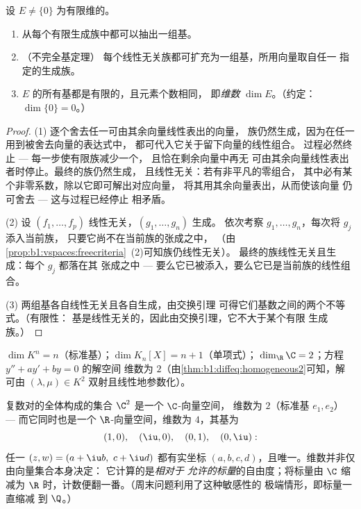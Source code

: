 \begin{theorem}[有限维中的基]\label{thm:b1:findim:bases}
设 $E \neq \{0\}$ 为有限维的。
\begin{enumerate}
  \item 从每个有限生成族中都可以抽出一组基。
  \item （不完全基定理）
        每个线性无关族都可扩充为一组基，所用向量取自任一
        指定的生成族。
  \item $E$ 的所有基都是有限的，且元素个数相同，
        即\emph{维数} $\dim E$。（约定：
        $\dim\{0\} = 0$。）
\end{enumerate}
\end{theorem}

\begin{proof}
(1) 逐个舍去任一可由其余向量线性表出的向量，
族仍然生成，因为在任一用到被舍去向量的表达式中，
都可代入它关于留下向量的线性组合。
过程必然终止 --- 每一步使有限族减少一个，
且恰在剩余向量中再无
可由其余向量线性表出者时停止。最终的族仍然生成，
且线性无关：若有非平凡的零组合，
其中必有某个非零系数，除以它即可解出对应向量，
将其用其余向量表出，从而使该向量
仍可舍去 --- 这与过程已经停止
相矛盾。

(2) 设 $(f_1, \dots, f_p)$ 线性无关，$(g_1, \dots, g_n)$ 生成。
依次考察 $g_1, \dots, g_n$，每次将 $g_j$ 添入当前族，
只要它尚不在当前族的张成之中，
（由\cref{prop:b1:vspaces:freecriteria}~(2)可知族仍线性无关）。
最终的族线性无关且生成：每个 $g_j$ 都落在其
张成之中 --- 要么它已被添入，要么它已是当前族的线性组合。

(3) 两组基各自线性无关且各自生成，由交换引理
可得它们基数之间的两个不等式。（有限性：
基是线性无关的，因此由交换引理，它不大于某个有限
生成族。）
\end{proof}

\begin{example}\label{ex:b1:findim:dims}
$\dim K^n = n$（标准基）；$\dim K_n[X] = n + 1$（单项式）；
$\dim_\R \C = 2$；方程 $y'' + ay' + by = 0$ 的解空间
维数为 $2$（由\cref{thm:b1:diffeq:homogeneous2}可知，解
可由 $(\lambda, \mu) \in K^2$ 双射且线性地参数化）。
\end{example}

\begin{example}
\label{ex:b1:findim:twodimensions}
复数对的全体构成的集合 $\C^2$ 是一个 $\C$-向量空间，
维数为 $2$（标准基 $e_1, e_2$） --- 而它同时也是一个
$\R$-向量空间，维数为 $4$，其基为
\[
(1, 0),\quad (\iu, 0),\quad (0, 1),\quad (0, \iu):
\]
任一 $(z, w) = (a + \iu b,\ c + \iu d)$ 都有实坐标
$(a, b, c, d)$，且唯一。维数并非仅由向量集合本身决定：
它计算的是\emph{相对于
允许的标量}的自由度；将标量由 $\C$
缩减为 $\R$ 时，计数便翻一番。（周末问题利用了这种敏感性的
极端情形，即标量一直缩减
到 $\Q$。）
\end{example}

